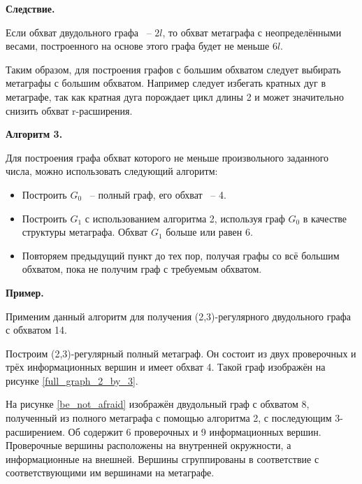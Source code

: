 \documentclass[14pt]{mmcs-article}
\begin{document}
\textbf{Следствие.}

Если обхват двудольного графа ~-- $2l$, то обхват метаграфа с неопределёнными весами, построенного на основе этого графа будет не меньше $6l$. 

Таким образом, для построения графов с большим обхватом следует выбирать метаграфы с большим обхватом. Например следует избегать кратных дуг в метаграфе, так как кратная дуга порождает цикл длины 2 и может значительно снизить обхват r-расширения.

\textbf{Алгоритм 3.}

Для построения графа обхват которого не меньше произвольного заданного числа, можно использовать следующий алгоритм:

\begin{itemize}
    \item Построить $G_0$ ~-- полный граф, его обхват ~-- 4.
    \item Построить $G_1$ с использованием алгоритма 2, используя граф $G_0$ в качестве структуры метаграфа. Обхват $G_1$ больше или равен 6.
    \item Повторяем предыдущий пункт до тех пор, получая графы со всё большим обхватом, пока не получим граф с требуемым обхватом.  
\end{itemize}

\textbf{Пример.}

Применим данный алгоритм для получения (2,3)-регулярного двудольного графа с обхватом 14.

Построим (2,3)-регулярный полный метаграф. Он состоит из двух проверочных и трёх информационных вершин и имеет обхват 4. Такой граф изображён на рисунке \ref{full_graph_2_by_3}.

На рисунке \ref{be_not_afraid} изображён двудольный граф с обхватом 8, полученный из полного метаграфа с помощью алгоритма 2, с последующим 3-расширением. Об содержит 6 проверочных и 9 информационных вершин. Проверочные вершины расположены на внутренней окружности, а информационные на внешней. Вершины сгруппированы в соответствие с соответствующими им вершинами на метаграфе.
\end{document}
